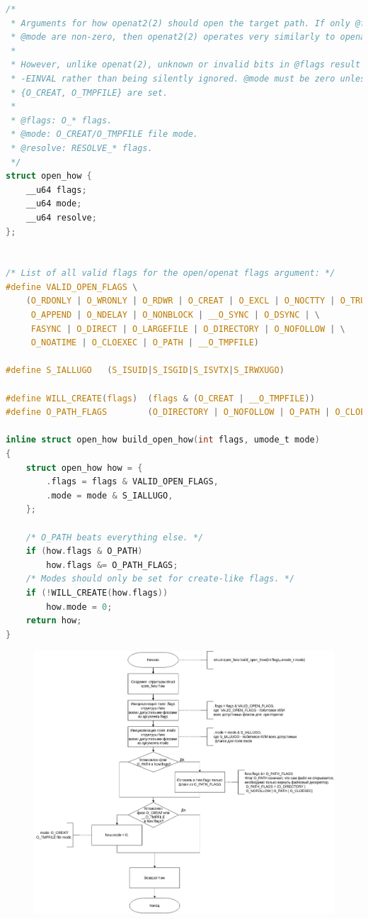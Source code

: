 \documentclass[a4paper,14pt]{extreport}
\begin{document}
\begin{lstlisting}[language=c, caption=Структура open_how и функция build_open_how()]
/*
 * Arguments for how openat2(2) should open the target path. If only @flags and
 * @mode are non-zero, then openat2(2) operates very similarly to openat(2).
 *
 * However, unlike openat(2), unknown or invalid bits in @flags result in
 * -EINVAL rather than being silently ignored. @mode must be zero unless one of
 * {O_CREAT, O_TMPFILE} are set.
 *
 * @flags: O_* flags.
 * @mode: O_CREAT/O_TMPFILE file mode.
 * @resolve: RESOLVE_* flags.
 */
struct open_how {
	__u64 flags;
	__u64 mode;
	__u64 resolve;
};


/* List of all valid flags for the open/openat flags argument: */
#define VALID_OPEN_FLAGS \
	(O_RDONLY | O_WRONLY | O_RDWR | O_CREAT | O_EXCL | O_NOCTTY | O_TRUNC | \
	 O_APPEND | O_NDELAY | O_NONBLOCK | __O_SYNC | O_DSYNC | \
	 FASYNC	| O_DIRECT | O_LARGEFILE | O_DIRECTORY | O_NOFOLLOW | \
	 O_NOATIME | O_CLOEXEC | O_PATH | __O_TMPFILE)
	 
#define S_IALLUGO	(S_ISUID|S_ISGID|S_ISVTX|S_IRWXUGO)

#define WILL_CREATE(flags)	(flags & (O_CREAT | __O_TMPFILE))
#define O_PATH_FLAGS		(O_DIRECTORY | O_NOFOLLOW | O_PATH | O_CLOEXEC)

inline struct open_how build_open_how(int flags, umode_t mode)
{
	struct open_how how = {
		.flags = flags & VALID_OPEN_FLAGS,
		.mode = mode & S_IALLUGO,
	};

	/* O_PATH beats everything else. */
	if (how.flags & O_PATH)
		how.flags &= O_PATH_FLAGS;
	/* Modes should only be set for create-like flags. */
	if (!WILL_CREATE(how.flags))
		how.mode = 0;
	return how;
}
\end{lstlisting}


\begin{figure}[H]
	\centering
	\includegraphics[scale=0.45]{img/build_open_how.jpg}
\end{figure}
\end{document}
